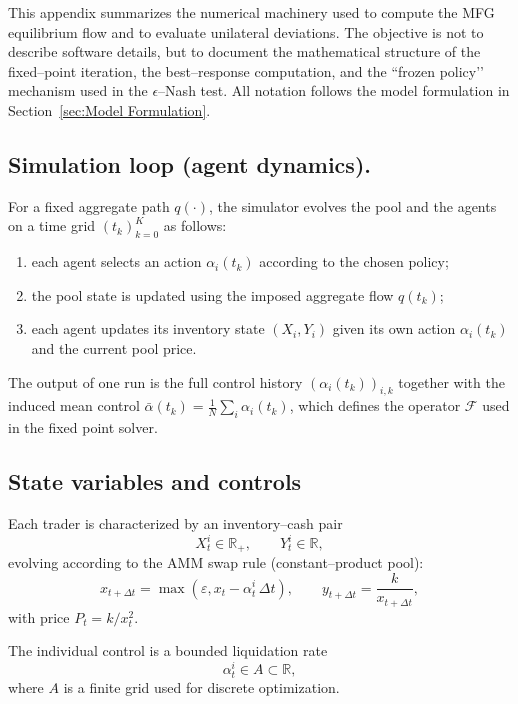 \documentclass[11pt]{article}
\theoremstyle{definition}
\begin{document}
This appendix summarizes the numerical machinery used to compute the MFG
equilibrium flow and to evaluate unilateral deviations.  
The objective is not to describe software details, but to document the
mathematical structure of the fixed–point iteration, the best–response
computation, and the ``frozen policy’’ mechanism used in the $\epsilon$–Nash test.
All notation follows the model formulation in Section~\ref{sec:Model Formulation}.

\subsection*{Simulation loop (agent dynamics).}
For a fixed aggregate path $q(\cdot)$, the simulator evolves the pool and the agents on a time grid $(t_k)_{k=0}^{K}$ as follows:
\begin{enumerate}
    \item each agent selects an action $\alpha_i(t_k)$ according to the chosen policy;
    \item the pool state is updated using the imposed aggregate flow $q(t_k)$;
    \item each agent updates its inventory state $(X_i,Y_i)$ given its own action $\alpha_i(t_k)$ and the current pool price.
\end{enumerate}
The output of one run is the full control history $(\alpha_i(t_k))_{i,k}$ together with the induced mean control $\bar{\alpha}(t_k)=\frac{1}{N}\sum_i \alpha_i(t_k)$, which defines the operator $\mathcal{F}$ used in the fixed point solver.

\subsection*{State variables and controls}

Each trader is characterized by an inventory--cash pair
\[
X^i_t \in \mathbb{R}_+,\qquad Y^i_t \in \mathbb{R},
\]
evolving according to the AMM swap rule (constant–product pool):
\[
x_{t+\Delta t}
    = \max(\varepsilon, x_t - \alpha^i_t\,\Delta t),\qquad
y_{t+\Delta t}
    = \frac{k}{x_{t+\Delta t}},
\]
with price
\(
P_t = k/x_t^2.
\)

The individual control is a bounded liquidation rate
\[
\alpha^i_t \in A \subset \mathbb{R},
\]
where $A$ is a finite grid used for discrete optimization.
\end{document}
